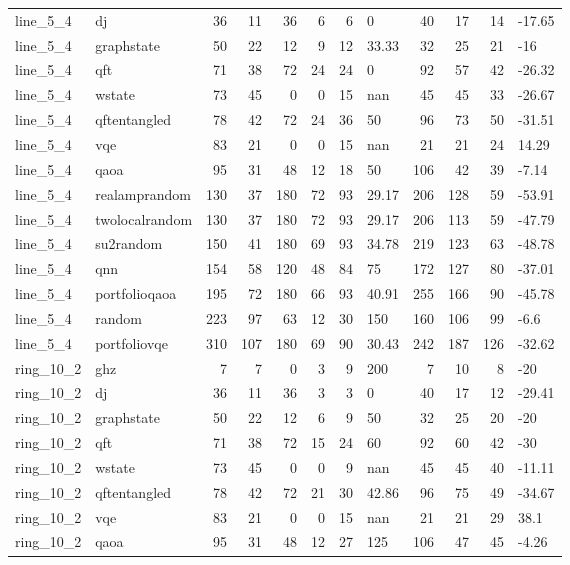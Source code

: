 \begin{longtable}{llrrrrrlrrrl}
line\_5\_4 & dj & 36 & 11 & 36 & 6 & 6 & 0 & 40 & 17 & 14 & -17.65 \\
line\_5\_4 & graphstate & 50 & 22 & 12 & 9 & 12 & 33.33 & 32 & 25 & 21 & -16 \\
line\_5\_4 & qft & 71 & 38 & 72 & 24 & 24 & 0 & 92 & 57 & 42 & -26.32 \\
line\_5\_4 & wstate & 73 & 45 & 0 & 0 & 15 & nan & 45 & 45 & 33 & -26.67 \\
line\_5\_4 & qftentangled & 78 & 42 & 72 & 24 & 36 & 50 & 96 & 73 & 50 & -31.51 \\
line\_5\_4 & vqe & 83 & 21 & 0 & 0 & 15 & nan & 21 & 21 & 24 & 14.29 \\
line\_5\_4 & qaoa & 95 & 31 & 48 & 12 & 18 & 50 & 106 & 42 & 39 & -7.14 \\
line\_5\_4 & realamprandom & 130 & 37 & 180 & 72 & 93 & 29.17 & 206 & 128 & 59 & -53.91 \\
line\_5\_4 & twolocalrandom & 130 & 37 & 180 & 72 & 93 & 29.17 & 206 & 113 & 59 & -47.79 \\
line\_5\_4 & su2random & 150 & 41 & 180 & 69 & 93 & 34.78 & 219 & 123 & 63 & -48.78 \\
line\_5\_4 & qnn & 154 & 58 & 120 & 48 & 84 & 75 & 172 & 127 & 80 & -37.01 \\
line\_5\_4 & portfolioqaoa & 195 & 72 & 180 & 66 & 93 & 40.91 & 255 & 166 & 90 & -45.78 \\
line\_5\_4 & random & 223 & 97 & 63 & 12 & 30 & 150 & 160 & 106 & 99 & -6.6 \\
line\_5\_4 & portfoliovqe & 310 & 107 & 180 & 69 & 90 & 30.43 & 242 & 187 & 126 & -32.62 \\
ring\_10\_2 & ghz & 7 & 7 & 0 & 3 & 9 & 200 & 7 & 10 & 8 & -20 \\
ring\_10\_2 & dj & 36 & 11 & 36 & 3 & 3 & 0 & 40 & 17 & 12 & -29.41 \\
ring\_10\_2 & graphstate & 50 & 22 & 12 & 6 & 9 & 50 & 32 & 25 & 20 & -20 \\
ring\_10\_2 & qft & 71 & 38 & 72 & 15 & 24 & 60 & 92 & 60 & 42 & -30 \\
ring\_10\_2 & wstate & 73 & 45 & 0 & 0 & 9 & nan & 45 & 45 & 40 & -11.11 \\
ring\_10\_2 & qftentangled & 78 & 42 & 72 & 21 & 30 & 42.86 & 96 & 75 & 49 & -34.67 \\
ring\_10\_2 & vqe & 83 & 21 & 0 & 0 & 15 & nan & 21 & 21 & 29 & 38.1 \\
ring\_10\_2 & qaoa & 95 & 31 & 48 & 12 & 27 & 125 & 106 & 47 & 45 & -4.26 \\

\end{longtable}
